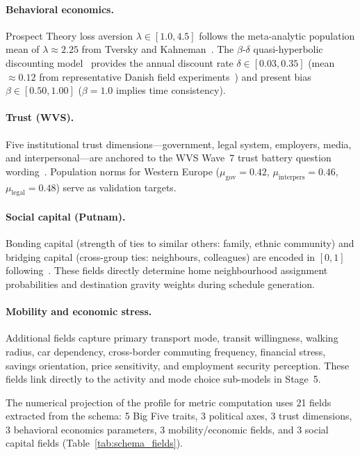 \documentclass[a4paper,12pt]{article}
\begin{document}
\paragraph{Behavioral economics.}
Prospect Theory loss aversion $\lambda \in [1.0, 4.5]$ follows the
meta-analytic population mean of $\lambda \approx 2.25$ from
Tversky and Kahneman~\cite{tversky1992advances}. The $\beta$-$\delta$
quasi-hyperbolic discounting model~\cite{laibson1997golden} provides the
annual discount rate $\delta \in [0.03, 0.35]$ (mean $\approx 0.12$ from
representative Danish field experiments~\cite{andersen2008eliciting}) and
present bias $\beta \in [0.50, 1.00]$ ($\beta = 1.0$ implies time consistency).

\paragraph{Trust (WVS).}
Five institutional trust dimensions---government, legal system, employers,
media, and interpersonal---are anchored to the WVS Wave~7 trust battery
question wording~\cite{inglehart2020worldvalues}. Population norms for
Western Europe ($\mu_\text{gov} = 0.42$, $\mu_\text{interpers} = 0.46$,
$\mu_\text{legal} = 0.48$) serve as validation targets.

\paragraph{Social capital (Putnam).}
Bonding capital (strength of ties to similar others: family, ethnic
community) and bridging capital (cross-group ties: neighbours, colleagues)
are encoded in $[0,1]$ following~\cite{putnam2000bowling}. These fields
directly determine home neighbourhood assignment probabilities and
destination gravity weights during schedule generation.

\paragraph{Mobility and economic stress.}
Additional fields capture primary transport mode, transit willingness,
walking radius, car dependency, cross-border commuting frequency, financial
stress, savings orientation, price sensitivity, and employment security
perception. These fields link directly to the activity and mode choice
sub-models in Stage~5.

The numerical projection of the profile for metric computation uses 21
fields extracted from the schema: 5 Big Five traits, 3 political axes,
3 trust dimensions, 3 behavioral economics parameters, 3 mobility/economic
fields, and 3 social capital fields (Table~\ref{tab:schema_fields}).
\end{document}
